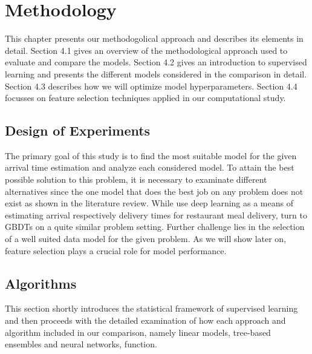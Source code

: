 

\chapter{Methodology}
This chapter presents our methodogolical approach and describes its elements in detail.
Section 4.1 gives an overview of the methodological approach used to evaluate and compare the models. 
Section 4.2 gives an introduction to supervised learning and presents the different models considered in the comparison in detail.
Section 4.3 describes how we will optimize model hyperparameters. 
Section 4.4 focusses on feature selection techniques applied in our computational study.

\section{Design of Experiments}

The primary goal of this study is to find the most suitable model for the given arrival time estimation and analyze each considered model. To attain the best possible solution to this problem, it is necessary to examinate different alternatives since the one model that does the best job on any problem does not exist as shown in the literature review. While \cite{Zhu2020_OFCTE_DL} use deep learning as a means of estimating arrival respectively delivery times for restaurant meal delivery, \cite{Hildebrandt2020_EAT} turn to GBDTs on a quite similar problem setting. Further challenge lies in the selection of a well suited data model for the given problem. As we will show later on, feature selection plays a crucial role for model performance. 

\section{Algorithms}

This section shortly introduces the statistical framework of supervised learning and then proceeds with the detailed examination of how each approach and algorithm included in our comparison, namely linear models, tree-based ensembles and neural networks, function. 


